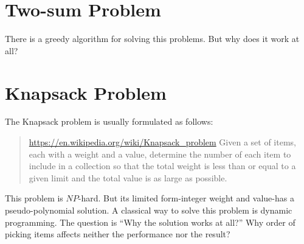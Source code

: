 \section{Two-sum Problem}

There is a greedy algorithm for solving this problems. But why does it work at all?

\section{Knapsack Problem}

The Knapsack problem is usually formulated as follows:
\begin{quote}
    \url{https://en.wikipedia.org/wiki/Knapsack_problem}
    Given a set of items, each with a weight and a value, determine the number of each item to
    include in a collection so that the total weight is less than or equal to a given limit and the
    total value is as large as possible.
\end{quote}

This problem is $NP$-hard.
But its limited form-integer weight and value-has a pseudo-polynomial solution.
A classical way to solve this problem is dynamic programming.
The question is ``Why the solution works at all?''
Why order of picking items affects neither the performance nor the result?
